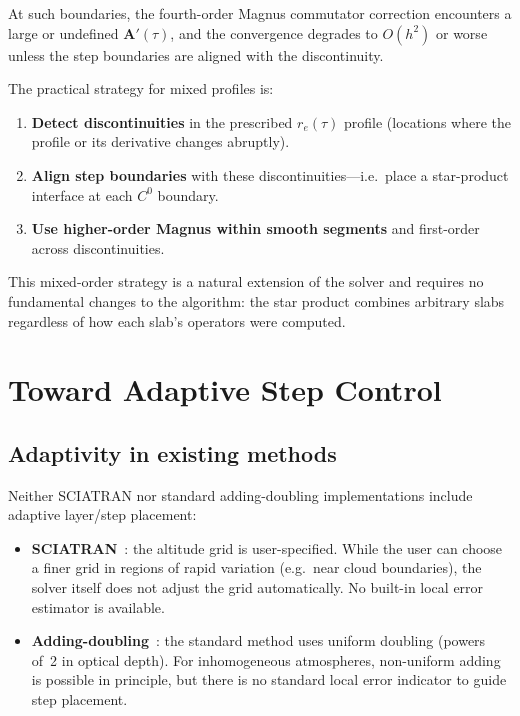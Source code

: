\documentclass[11pt,a4paper]{article}
\newcommand{\mat}[1]{\mathbf{#1}}
\theoremstyle{definition}
\begin{document}
At such boundaries, the fourth-order Magnus commutator correction
encounters a large or undefined $\mat{A}'(\tau)$, and the convergence
degrades to $O(h^2)$ or worse unless the step boundaries are aligned
with the discontinuity.

The practical strategy for mixed profiles is:
\begin{enumerate}[nosep]
\item \textbf{Detect discontinuities} in the prescribed $r_e(\tau)$
  profile (locations where the profile or its derivative changes
  abruptly).
\item \textbf{Align step boundaries} with these discontinuities---i.e.\
  place a star-product interface at each $C^0$ boundary.
\item \textbf{Use higher-order Magnus within smooth segments} and
  first-order across discontinuities.
\end{enumerate}

This mixed-order strategy is a natural extension of the solver and
requires no fundamental changes to the algorithm: the star product
combines arbitrary slabs regardless of how each slab's operators were
computed.


\section{Toward Adaptive Step Control}\label{sec:adaptivity}

\subsection{Adaptivity in existing methods}\label{sec:adapt_existing}

Neither SCIATRAN nor standard adding-doubling implementations include
adaptive layer/step placement:
\begin{itemize}[nosep]
\item \textbf{SCIATRAN}~\cite{rozanov2014}: the altitude grid is
  user-specified.  While the user can choose a finer grid in regions of
  rapid variation (e.g.\ near cloud boundaries), the solver itself does
  not adjust the grid automatically.  No built-in local error estimator
  is available.
\item \textbf{Adding-doubling}~\cite{hansen1974}: the standard method
  uses uniform doubling (powers of~2 in optical depth).  For
  inhomogeneous atmospheres, non-uniform adding is possible in
  principle, but there is no standard local error indicator to guide
  step placement.
\end{itemize}
\end{document}
